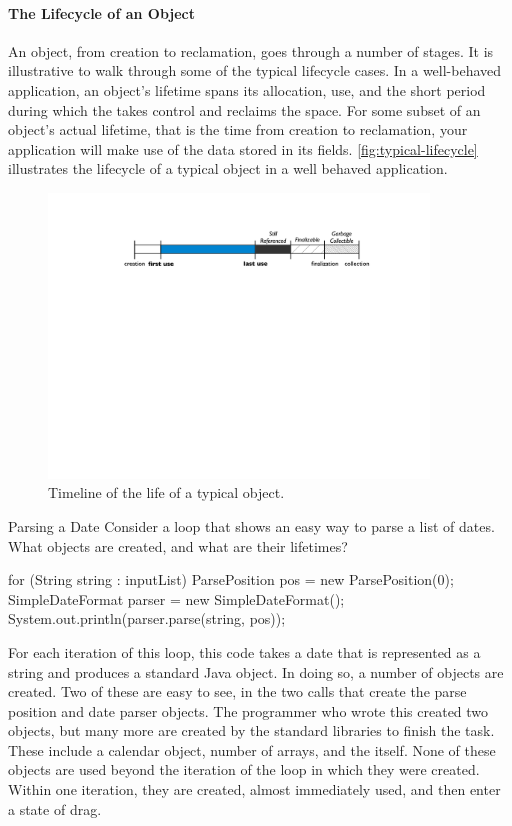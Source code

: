 \paragraph{The Lifecycle of an Object}
An object, from creation to reclamation, goes through a number of 
stages. It is illustrative to walk through some of the typical lifecycle cases.
In a well-behaved application, an object's lifetime spans its allocation,
use, and the short period during which the \jre takes control and reclaims the
space. For some subset of an object's actual lifetime, that is the time from
creation to reclamation, your application will make use of the data stored in its
fields. \autoref{fig:typical-lifecycle} illustrates the lifecycle of a typical
object in a well behaved application.

\begin{figure}
	\includegraphics[width=0.9\textwidth]{part4/Figures/lifetime/object-lifecycle}
	\caption{Timeline of the life of a typical object.}
	\label{fig:typical-lifecycle}
\end{figure}


\begin{example}{Parsing a Date} Consider a loop that shows an easy way to parse
a list of dates. What objects are created, and what are their lifetimes?
\begin{shortlisting}
for (String string : inputList) {
	ParsePosition pos = new ParsePosition(0);
	SimpleDateFormat parser = new SimpleDateFormat();
	System.out.println(parser.parse(string, pos));
}
\end{shortlisting}
\end{example}

For each iteration of this loop, this code takes a date that is represented as a
string and produces a standard Java  object. In doing so, a number of
objects are created. Two of these are easy to see, in the two  calls
that create the parse position and date parser objects. The programmer who wrote
this created two objects, but many more are created by the standard libraries to
finish the task. These include a calendar object, number of arrays, and the
 itself. None of these objects are used beyond the iteration of the
loop in which they were created. Within one iteration, they are created, almost
immediately used, and then enter a state of drag.

